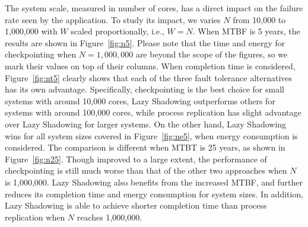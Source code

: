 The system scale, measured in number of cores, has a direct impact on the failure rate seen by the application. To study its impact, we varies $N$ from 10,000 to 1,000,000 with $W$ scaled proportionally, i.e., $W=N$. When MTBF is 5 years, the results are shown in Figure~\ref{fig:n5}. Please note that the time and energy for checkpointing when $N=1,000,000$ are beyond the scope of the figures, so we mark their values on top of their columns. When completion time is considered, Figure~\ref{fig:nt5} clearly shows that each of the three fault tolerance alternatives has its own advantage. Specifically, checkpointing is the best choice for small systems with around 10,000 cores, Lazy Shadowing outperforms others for systems with around 100,000 cores, while process replication has slight advantage over Lazy Shadowing for larger systems. On the other hand, Lazy Shadowing wins for all system sizes covered in Figure~\ref{fig:ne5}, when energy consumption is considered. The comparison is different when MTBT is 25 years, as shown in Figure~\ref{fig:n25}. Though improved to a large extent, the performance of checkpointing is still much worse than that of the other two approaches when $N$ is 1,000,000. Lazy Shadowing also benefits from the increased MTBF, and further reduces its completion time and energy consumption for system sizes. In addition, Lazy Shadowing is able to achieve shorter completion time than process replication when $N$ reaches 1,000,000.


